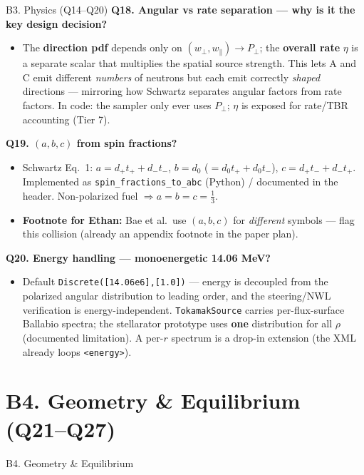\documentclass[11pt,aspectratio=169]{beamer}
\newcommand{\qitem}[1]{\medskip\textbf{#1}\par}
\begin{document}
\begin{frame}[allowframebreaks]{B3. Physics (Q14--Q20)}
\qitem{Q18. Angular vs rate separation --- why is it the key design decision?}
\begin{itemize}
\item The \textbf{direction pdf} depends only on $(w_\perp, w_\parallel) \to P_\perp$; the
      \textbf{overall rate} $\eta$ is a separate scalar that multiplies the spatial source
      strength. This lets A and C emit different \emph{numbers} of neutrons but each emit
      correctly \emph{shaped} directions --- mirroring how Schwartz separates angular factors
      from rate factors. In code: the sampler only ever uses $P_\perp$; $\eta$ is exposed for
      rate/TBR accounting (Tier 7).
\end{itemize}

\framebreak
\qitem{Q19. $(a,b,c)$ from spin fractions?}
\begin{itemize}
\item Schwartz Eq.~1: $a = d_+ t_+ + d_- t_-$, $b = d_0$ ($= d_0 t_+ + d_0 t_-$),
      $c = d_+ t_- + d_- t_+$. Implemented as \texttt{spin\_fractions\_to\_abc} (Python) /
      documented in the header. Non-polarized fuel $\Rightarrow a = b = c = \tfrac13$.
\item \textbf{Footnote for Ethan:} Bae et al.\ use $(a,b,c)$ for \emph{different} symbols ---
      flag this collision (already an appendix footnote in the paper plan).
\end{itemize}

\qitem{Q20. Energy handling --- monoenergetic 14.06 MeV?}
\begin{itemize}
\item Default \texttt{Discrete([14.06e6],[1.0])} --- energy is decoupled from the polarized
      angular distribution to leading order, and the steering/NWL verification is
      energy-independent. \texttt{TokamakSource} carries per-flux-surface Ballabio spectra; the
      stellarator prototype uses \textbf{one} distribution for all $\rho$ (documented
      limitation). A per-$r$ spectrum is a drop-in extension (the XML already loops
      \texttt{<energy>}).
\end{itemize}
\end{frame}

\section{B4. Geometry \& Equilibrium (Q21--Q27)}
\begin{frame}
\centering\vfill
{\Large\color{key} B4. Geometry \& Equilibrium}\par
{}
\vfill
\end{frame}
\end{document}
